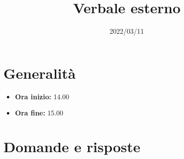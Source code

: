 \documentclass{classes/base}
\title{Verbale esterno}
\date{2022/03/11}
\author{\angela}
\renewcommand{\maketitle}{
    
}
\begin{document}
    \maketitle

    \section*{Generalità}
    \begin{itemize}
        \item \textbf{Ora inizio:} 14.00
        \item \textbf{Ora fine:} 15.00
    \end{itemize}

    \section*{Domande e risposte}
\end{document}

